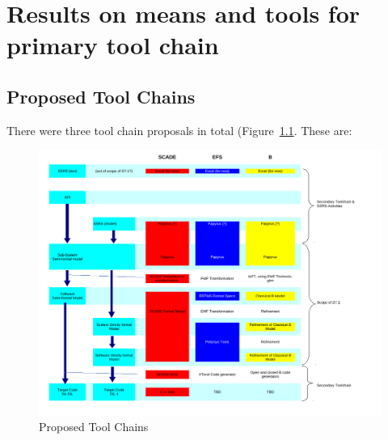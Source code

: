 \chapter{Results on means and tools for primary tool chain}
\label{sec:results}

\section{Proposed Tool Chains}

There were three tool chain proposals in total (Figure~\ref{fig:proposals}.  These are:

 \begin{figure}[b!]
  \centering
  \includegraphics[width=\linewidth]{images/compare-toolchains.pdf}
  \caption{Proposed Tool Chains}
  \label{fig:proposals}
\end{figure}

